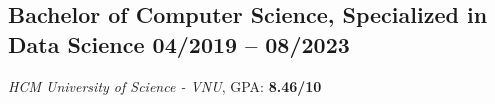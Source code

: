 
\subsection{Bachelor of Computer Science, Specialized in Data Science \hfill 04/2019 -- 08/2023}
\textit{HCM University of Science - VNU}, GPA: \textbf{8.46/10}


